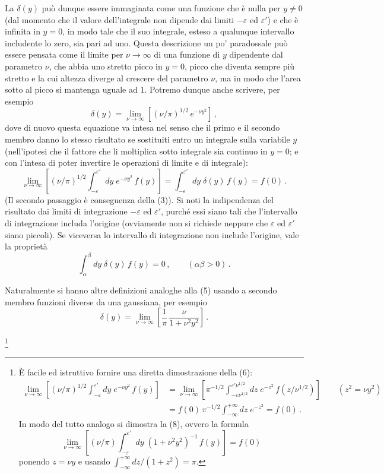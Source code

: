 \documentclass[11pt, a4paper]{book}
\numberwithin{equation}{section}
\begin{document}
La $\delta(y)$ può dunque essere immaginata come una funzione che è nulla per $y\neq0$ (dal momento che il valore dell'integrale non dipende dai limiti $-\varepsilon$ ed $\varepsilon'$) e che è infinita in $y=0$, in modo tale che il suo integrale, esteso a qualunque intervallo includente lo zero, sia pari ad uno. Questa descrizione un po' paradossale può essere pensata come il limite per $\nu\to\infty$ di una funzione di $y$ dipendente dal parametro $\nu$, che abbia uno stretto picco in $y=0$, picco che diventa sempre più stretto e la cui altezza diverge al crescere del parametro $\nu$, ma in modo che l'area sotto al picco si mantenga uguale ad 1. Potremo dunque anche scrivere, per esempio
\begin{equation}
  \delta(y) = \lim_{\nu\to\infty}\left[(\nu/\pi)^{1/2}\,e^{-\nu y^2}\right]\,, \tag{5}
\end{equation}
dove di nuovo questa equazione va intesa nel senso che il primo e il secondo membro danno lo stesso risultato se sostituiti entro un integrale sulla variabile $y$ (nell'ipotesi che il fattore che li moltiplica sotto integrale sia continuo in $y=0$; e con l'intesa di poter invertire le operazioni di limite e di integrale):
\begin{equation}
  \lim_{\nu\to\infty}\left[(\nu/\pi)^{1/2}\int_{-\varepsilon}^{\varepsilon'} dy\;
  e^{-\nu y^2}\,f(y)\right]
  = \int_{-\varepsilon}^{\varepsilon'} dy\;\delta(y)\,f(y) = f(0)\,. \tag{6}
\end{equation}
(Il secondo passaggio è conseguenza della (3)). Si noti la indipendenza del risultato dai limiti di integrazione $-\varepsilon$ ed $\varepsilon'$, purché essi siano tali che l'intervallo di integrazione includa l'origine (ovviamente non si richiede neppure che $\varepsilon$ ed $\varepsilon'$ siano piccoli). Se viceversa lo intervallo di integrazione non include l'origine, vale la proprietà
\begin{equation}
  \int_\alpha^\beta dy\;\delta(y)\,f(y) = 0\,,\qquad(\alpha\beta > 0)\,. \tag{7}
\end{equation}

Naturalmente si hanno altre definizioni analoghe alla (5) usando a secondo membro funzioni diverse da una gaussiana, per esempio
\begin{equation}
  \delta(y) = \lim_{\nu\to\infty}\left[\frac{1}{\pi}\,\frac{\nu}{1+\nu^2 y^2}\right]\,. \tag{8}
\end{equation}

\footnote{È facile ed istruttivo fornire una diretta dimostrazione della (6):
\begin{align*}
  \lim_{\nu\to\infty}\left[(\nu/\pi)^{1/2}\int_{-\varepsilon}^{\varepsilon'} dy\;
  e^{-\nu y^2}\,f(y)\right]
  &= \lim_{\nu\to\infty}\left[\pi^{-1/2}\int_{-\varepsilon\nu^{1/2}}^{\varepsilon'\nu^{1/2}} dz\;
  e^{-z^2}\,f(z/\nu^{1/2})\right]
  \qquad(z^2=\nu y^2)\\
  &= f(0)\,\pi^{-1/2}\int_{-\infty}^{+\infty} dz\;e^{-z^2} = f(0)\,.
\end{align*}
In modo del tutto analogo si dimostra la (8), ovvero la formula
\[
  \lim_{\nu\to\infty}\left[(\nu/\pi)\int_{-\varepsilon}^{\varepsilon'} dy\;
  (1+\nu^2 y^2)^{-1}\,f(y)\right] = f(0)
\]
ponendo $z=\nu y$ e usando $\int_{-\infty}^{+\infty} dz/(1+z^2) = \pi$.}
\end{document}
